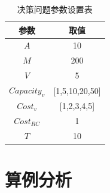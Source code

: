 \documentclass{article}
\begin{document}
\begin{table}[H]
    \centering
    \caption{决策问题参数设置表}
    \begin{tabular}{ |c|c| } 
     \hline
     参数 & 取值 \\ 
     \hline
     $A$ & 10 \\ 
     \hline
     $M$ & 200 \\ 
     \hline
     $V$ & 5 \\ 
     \hline
     $Capacity_v$ & [1,5,10,20,50] \\ 
     \hline
     $Cost_v$ & [1,2,3,4,5]\\ 
     \hline
     $Cost_{RC}$ & 1 \\
     \hline
     $T$ & 10 \\ 
     \hline
    \end{tabular}
    \label{tab:rv}
\end{table}

\section{算例分析}
\newpage


\end{document}
